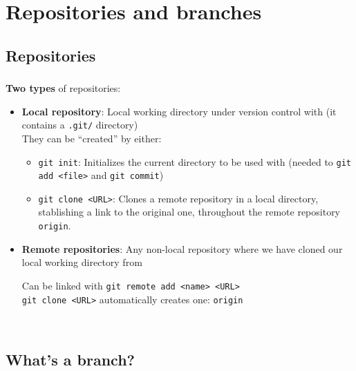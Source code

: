 
\section{Repositories and branches}

\subsection{Repositories}

\begin{frame}
  \frametitle{\insertsubsection}

  \textbf{Two types} of repositories: \vspacing
  \begin{itemize}
  \item \textbf{Local repository}: Local working directory under
    version control with \git (it contains a \texttt{.git/}
    directory)\\ \vspacing They can be ``created'' by either:\vspacing
    \begin{itemize}
    \item \texttt{git init}: Initializes the current directory to be
      used with \git (needed to \texttt{git add <file>} and
      \texttt{git commit}) \vspacing

    \item \texttt{git clone <URL>}: Clones a remote repository in a
      local directory, stablishing a link to the original one,
      throughout the remote repository \texttt{origin}.
    \end{itemize} \vspacing

  \item \textbf{Remote repositories}: Any non-local repository where
    we have cloned our local working directory from\\
    \vspacing

    Can be linked with \texttt{git remote add <name> <URL>} \\
    \texttt{git clone <URL>} automatically creates one: \texttt{origin}
  \end{itemize}\
\end{frame}


\subsection{What's a branch?}

